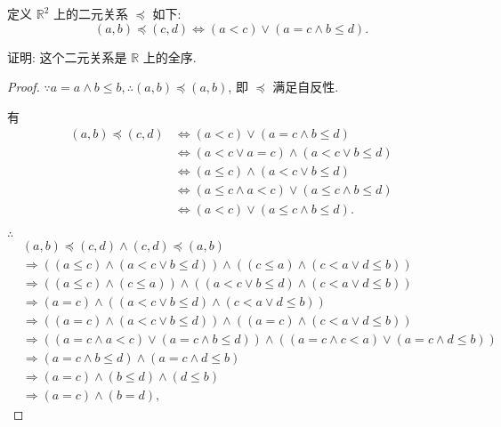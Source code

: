 \documentclass[color=black,device=normal,lang=cn,mode=geye]{elegantnote}
\begin{document}
\begin{exercisec}[2.4.5]
    定义 $\mathbb{R}^2$ 上的二元关系 $\preceq$ 如下:
    \[(a,b)\preceq(c,d)\Leftrightarrow(a<c)\vee(a=c\wedge b\leq d).\]

    证明: 这个二元关系是 $\mathbb{R}$ 上的全序.
\end{exercisec}
\begin{proof}
    $\because a=a\wedge b\leq b,\therefore(a,b)\preceq(a,b)$, 即 $\preceq$ 满足自反性.
    
    有
    \begin{align*}
        (a,b)\preceq(c,d) & \Leftrightarrow(a<c)\vee(a=c\wedge b\leq d) \\
        & \Leftrightarrow(a<c\vee a=c)\wedge(a<c\vee b\leq d) \\
        & \Leftrightarrow(a\leq c)\wedge(a<c\vee b\leq d) \\
        & \Leftrightarrow(a\leq c\wedge a<c)\vee(a\leq c\wedge b\leq d) \\
        & \Leftrightarrow(a<c)\vee(a\leq c\wedge b\leq d).
    \end{align*}

    $\therefore$
    \begin{align*}
        & (a,b)\preceq(c,d)\wedge(c,d)\preceq(a,b) \\
        & \Rightarrow((a\leq c)\wedge(a<c\vee b\leq d))\wedge((c\leq a)\wedge(c<a\vee d\leq b)) \\
        & \Rightarrow((a\leq c)\wedge(c\leq a))\wedge((a<c\vee b\leq d)\wedge(c<a\vee d\leq b)) \\
        & \Rightarrow(a=c)\wedge((a<c\vee b\leq d)\wedge(c<a\vee d\leq b)) \\
        & \Rightarrow((a=c)\wedge(a<c\vee b\leq d))\wedge((a=c)\wedge(c<a\vee d\leq b)) \\
        & \Rightarrow((a=c\wedge a<c)\vee(a=c\wedge b\leq d))\wedge((a=c\wedge c<a)\vee(a=c\wedge d\leq b)) \\
        & \Rightarrow(a=c\wedge b\leq d)\wedge(a=c\wedge d\leq b) \\
        & \Rightarrow(a=c)\wedge(b\leq d)\wedge(d\leq b) \\
        & \Rightarrow(a=c)\wedge(b=d),
    \end{align*}


\end{proof}
\end{document}
